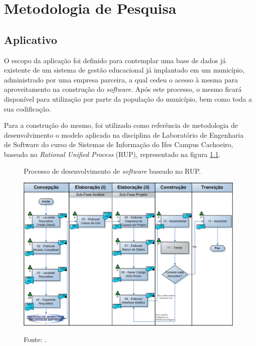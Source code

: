 \chapter{\textbf{Metodologia de Pesquisa}} %
\sloppy %

\section{Aplicativo}

O escopo da aplicação foi definido para contemplar uma base de dados já existente de um sistema de gestão educacional já implantado em um município, administrado por uma empresa parceira, a qual cedeu o acesso à mesma para aproveitamento na construção do \textit{software}. Após este processo, o mesmo ficará disponível para utilização por parte da população do município, bem como toda a sua codificação.

Para a construção do mesmo, foi utilizado como referência de metodologia de desenvolvimento o modelo aplicado na disciplina de Laboratório de Engenharia de Software do curso de Sistemas de Informação do Ifes Campus Cachoeiro, baseado no \textit{Rational Unified Process} (RUP), representado na figura \ref{figura:rup}. 

\begin{figure}[H]
	\caption{Processo de desenvolvimento de \textit{software} baseado no RUP.}
	\centering %
	\includegraphics[width=16cm]{resources/pds_rup.png} %
	\label{figura:rup}
	\captionsetup{singlelinecheck = false, format= hang, justification=raggedright, labelsep=space, width=16cm}
	\caption*{\footnotesize Fonte: .}
\end{figure}

